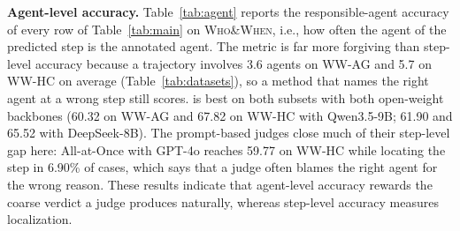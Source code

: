 \textbf{Agent-level accuracy.}
Table~\ref{tab:agent} reports the responsible-agent accuracy of every row of Table~\ref{tab:main} on \textsc{Who\&When}, i.e., how often the agent of the predicted step is the annotated agent. The metric is far more forgiving than step-level accuracy because a trajectory involves 3.6 agents on \textsc{WW-AG} and 5.7 on \textsc{WW-HC} on average (Table~\ref{tab:datasets}), so a method that names the right agent at a wrong step still scores. \soap{} is best on both subsets with both open-weight backbones (60.32 on \textsc{WW-AG} and 67.82 on \textsc{WW-HC} with Qwen3.5-9B; 61.90 and 65.52 with DeepSeek-8B). The prompt-based judges close much of their step-level gap here: All-at-Once with GPT-4o reaches 59.77 on \textsc{WW-HC} while locating the step in 6.90\% of cases, which says that a judge often blames the right agent for the wrong reason. These results indicate that agent-level accuracy rewards the coarse verdict a judge produces naturally, whereas step-level accuracy measures localization.


